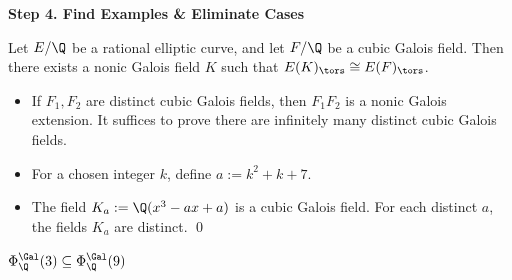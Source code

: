 \begin{frame}[plain]
\vfill
\begin{center} {\bfseries \Large \textcolor{UniGray}{Step 4. Find Examples \& Eliminate Cases}} \end{center}
\vfill 
\end{frame}





\begin{frame}[plain]
\end{frame}





\begin{frame}[plain]
\begin{prop}
Let $E/\Q$ be a rational elliptic curve, and let $F/\Q$ be a cubic Galois field. Then there exists a nonic Galois field $K$ such that $E(K)_\tors \cong E(F)_\tors$.
\end{prop}

\pf 
\begin{itemize}
\item If $F_1, F_2$ are distinct cubic Galois fields, then $F_1F_2$ is a nonic Galois extension. It suffices to prove there are infinitely many distinct cubic Galois fields. 
\item For a chosen integer $k$, define $a:= k^2 + k + 7$.
\item The field $K_a:= \Q(x^3 - ax + a)$ is a cubic Galois field. For each distinct $a$, the fields $K_a$ are distinct. \hfill\qed
\end{itemize}

\begin{cor}
$\Phi_\Q^{\Gal}(3) \subseteq \Phi_\Q^{\Gal}(9)$
\end{cor}
\end{frame}





